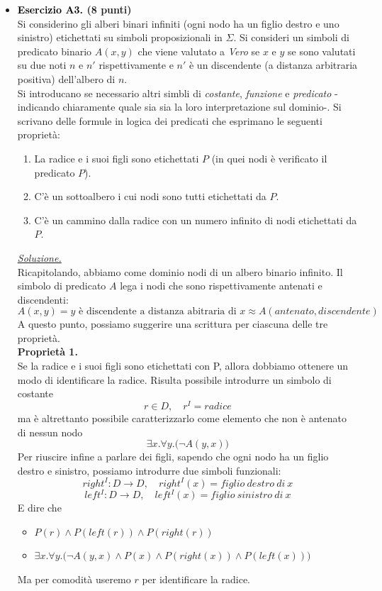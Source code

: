 \documentclass[a4paper,10pt]{article}
\begin{document}
{\begin{itemize}[label=, leftmargin=0pt]
    \item \textbf{\textcolor{black}{Esercizio A3.} (8 punti)} \\ 	
    Si considerino gli alberi binari infiniti (ogni nodo ha un figlio destro e uno sinistro) etichettati su simboli proposizionali in $\Sigma$. Si consideri un simboli di predicato binario $A(x,y)$ che viene valutato a \textit{Vero} se $x$ e $y$ se sono valutati su due noti $n$ e $n'$ rispettivamente e $n'$ è un discendente (a distanza arbitraria positiva) dell'albero di $n$.\\
    Si introducano se necessario altri simbli di \textit{costante}, \textit{funzione} e \textit{predicato} -indicando chiaramente quale sia sia la loro interpretazione sul dominio-. 
    Si scrivano delle formule in logica dei predicati che esprimano le seguenti proprietà:
    \begin{enumerate}
        \item La radice e i suoi figli sono etichettati $P$ (in quei nodi è verificato il predicato $P$).
        \item C'è un sottoalbero i cui nodi sono tutti etichettati da $P$.
        \item C'è un cammino dalla radice con un numero infinito di nodi etichettati da $P$.
    \end{enumerate}

    \begin{osservazioni}
    \underline{\textit{Soluzione.}}\\
    Ricapitolando, abbiamo come dominio nodi di un albero binario infinito. Il simbolo di predicato $A$ lega i nodi che sono rispettivamente antenati e discendenti:
    $$A(x,y)=y \text{ è discendente a distanza abitraria di }x \approx A(antenato, discendente)$$
    A questo punto, possiamo suggerire una scrittura per ciascuna delle tre proprietà.\\

    \textbf{Proprietà 1.}\\
    Se la radice e i suoi figli sono etichettati con P, allora dobbiamo ottenere un modo di identificare la radice. Risulta possibile introdurre un simbolo di costante
    $$r\in D,\quad r^I=radice$$
    ma è altrettanto possibile caratterizzarlo come elemento che non è antenato di nessun nodo
    $$\exists x.\forall y.\bigg(\lnot A(y,x)\bigg)$$
    Per riuscire infine a parlare dei figli, sapendo che ogni nodo ha un figlio destro e sinistro, possiamo introdurre due simboli funzionali:
    $$right^I:D\rightarrow D,\quad right^I(x)=figlio\ destro\ di\ x$$
    $$left^I:D\rightarrow D,\quad left^I(x)=figlio\ sinistro\ di\ x$$
    E dire che
    \begin{itemize}
        \item $P(r) \land P(left(r)) \land P(right(r))$
        \item $\exists x.\forall y.\bigg(\lnot A(y,x) \land P(x)\land P(right(x))\land P(left(x))\bigg)$
    \end{itemize}
    Ma per comodità useremo $r$ per identificare la radice.\\


\end{osservazioni}
\end{itemize}}
\end{document}
